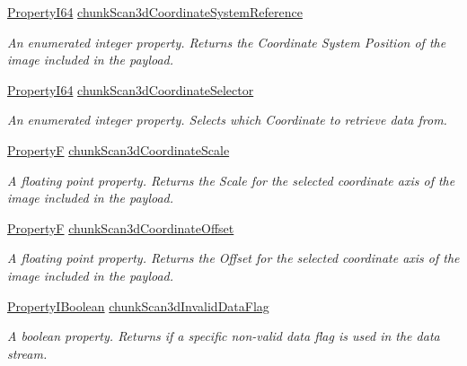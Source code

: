 \begin{DoxyCompactItemize}
\hyperlink{group___common_interface_ga81749b2696755513663492664a18a893}{Property\+I64} \hyperlink{classmv_i_m_p_a_c_t_1_1acquire_1_1_gen_i_cam_1_1_chunk_data_control_a15827600dc5405f7893efdcf8dfa0569}{chunk\+Scan3d\+Coordinate\+System\+Reference}
\begin{DoxyCompactList}\small\item\em An enumerated integer property. Returns the Coordinate System Position of the image included in the payload. \end{DoxyCompactList}\item 
\hyperlink{group___common_interface_ga81749b2696755513663492664a18a893}{Property\+I64} \hyperlink{classmv_i_m_p_a_c_t_1_1acquire_1_1_gen_i_cam_1_1_chunk_data_control_abcd836abcc68145bec18c5b45e189324}{chunk\+Scan3d\+Coordinate\+Selector}
\begin{DoxyCompactList}\small\item\em An enumerated integer property. Selects which Coordinate to retrieve data from. \end{DoxyCompactList}\item 
\hyperlink{group___common_interface_gaf54865fe5a3d5cfd15f9a111b40d09f9}{Property\+F} \hyperlink{classmv_i_m_p_a_c_t_1_1acquire_1_1_gen_i_cam_1_1_chunk_data_control_a652394e0ffd066f97020683b5640c399}{chunk\+Scan3d\+Coordinate\+Scale}
\begin{DoxyCompactList}\small\item\em A floating point property. Returns the Scale for the selected coordinate axis of the image included in the payload. \end{DoxyCompactList}\item 
\hyperlink{group___common_interface_gaf54865fe5a3d5cfd15f9a111b40d09f9}{Property\+F} \hyperlink{classmv_i_m_p_a_c_t_1_1acquire_1_1_gen_i_cam_1_1_chunk_data_control_a18a1e19081d8b40f6f297abf6b68fc5c}{chunk\+Scan3d\+Coordinate\+Offset}
\begin{DoxyCompactList}\small\item\em A floating point property. Returns the Offset for the selected coordinate axis of the image included in the payload. \end{DoxyCompactList}\item 
\hyperlink{group___common_interface_ga44f9437e24b21b6c93da9039ec6786aa}{Property\+I\+Boolean} \hyperlink{classmv_i_m_p_a_c_t_1_1acquire_1_1_gen_i_cam_1_1_chunk_data_control_a60ad92001a22ff71b3e9241272d650d3}{chunk\+Scan3d\+Invalid\+Data\+Flag}
\begin{DoxyCompactList}\small\item\em A boolean property. Returns if a specific non-\/valid data flag is used in the data stream. \end{DoxyCompactList}\item 

\end{DoxyCompactItemize}
